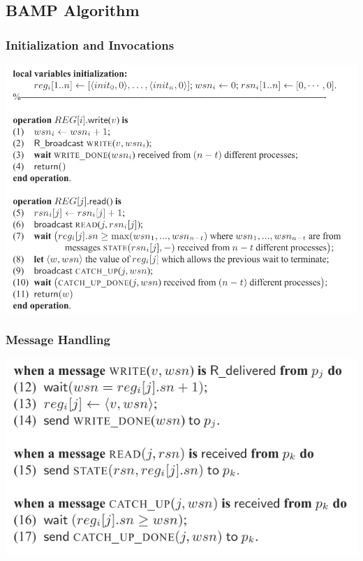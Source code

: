 
\subsection{BAMP Algorithm}

\begin{frame}
    \frametitle{Initialization and Invocations}
    \begin{center}
        \includegraphics[scale=.7]{alg1.png}
    \end{center}
\end{frame}
\begin{frame}
    \frametitle{Message Handling}
    \begin{center}
        \includegraphics[scale=.7]{alg2.png}
    \end{center}
\end{frame}